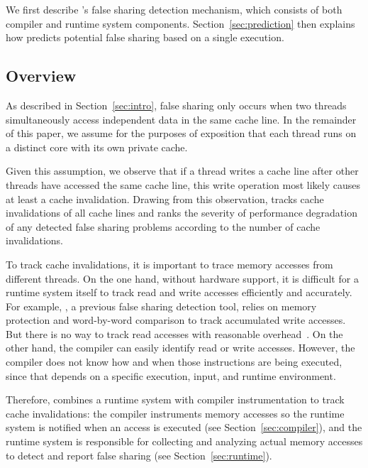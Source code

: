 \label{sec:detection}

We first describe \Predator{}'s false sharing detection mechanism,
which consists of both compiler and runtime system
components. Section~\ref{sec:prediction} then explains how \Predator{}
predicts potential false sharing based on a single execution.

\subsection{Overview}
\label{sec:overview}
As described in Section~\ref{sec:intro}, 
false sharing only occurs when two threads
simultaneously access independent data in the same cache line.
In the remainder of this paper, we assume for the purposes of exposition that each thread runs on a 
distinct core with its own private cache.

Given this assumption, we observe that 
if a thread writes a cache line after other threads have 
accessed the same cache line, this write operation most likely causes at least
a cache invalidation.
Drawing from this observation, \Predator{} tracks cache invalidations of all 
cache lines and ranks the severity of performance degradation of any detected false sharing problems 
according to the number of cache invalidations. 
 
To track cache invalidations, it is important to trace memory accesses
from different threads.  On the one hand, without hardware support, it
is difficult for a runtime system itself to track read and write
accesses efficiently and accurately.  For example, \Sheriff{}, a
previous false sharing detection tool, relies on memory protection and
word-by-word comparison to track accumulated write accesses.  But
there is no way to track read accesses with reasonable
overhead~\cite{sheriff}.  On the other hand, the compiler can easily
identify read or write accesses. However, the compiler does not know
how and when those instructions are being executed, since that depends
on a specific execution, input, and runtime environment.

Therefore, \Predator{} combines a runtime system with compiler
instrumentation to track cache invalidations: the compiler
instruments memory accesses so the runtime system is notified when an
access is executed (see Section~\ref{sec:compiler}), and the runtime
system is responsible for collecting and analyzing actual memory
accesses to detect and report false sharing (see Section~\ref{sec:runtime}).

